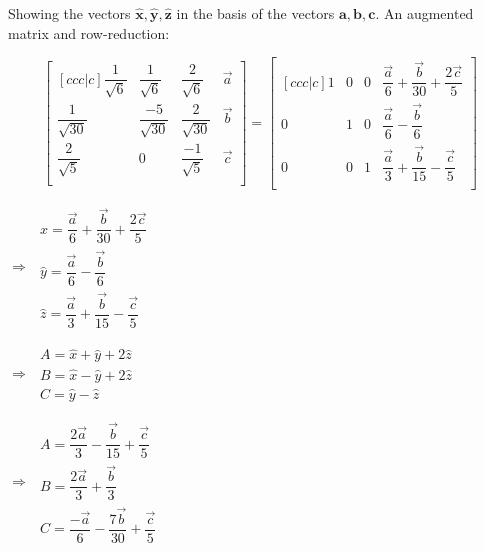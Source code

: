 \documentclass[fleqn]{article}
\begin{document}
\begin{enumerate}
Showing the vectors $\mathbf{\hat{x}}, \mathbf{\hat{y}}, \mathbf{\hat{z}}$ in the basis of the vectors $\mathbf{a}, \mathbf{b}, \mathbf{c}$. An augmented matrix and row-reduction:

\makeatletter
\renewcommand*\env@matrix[1][*\c@MaxMatrixCols c]{
  \hskip -\arraycolsep
  \let\@ifnextchar\new@ifnextchar
  \array{#1}}
\makeatother
\begin{equation}
  \begin{bmatrix}[ccc|c]
    \dfrac{1}{\sqrt{6}} & \dfrac{1}{\sqrt{6}} & \dfrac{2}{\sqrt{6}} & \overrightarrow{a} \\
    \dfrac{1}{\sqrt{30}} & \dfrac{-5}{\sqrt{30}} & \dfrac{2}{\sqrt{30}} & \overrightarrow{b} \\
    \dfrac{2}{\sqrt{5}} & 0 & \dfrac{-1}{\sqrt{5}}  & \overrightarrow{c} \\
  \end{bmatrix}
  =
  \begin{bmatrix}[ccc|c]
    1 & 0 & 0 & \dfrac{\overrightarrow{a}}{6}+\dfrac{\overrightarrow{b}}{30}+\dfrac{2\overrightarrow{c}}{5} \\
    0 & 1 & 0 & \dfrac{\overrightarrow{a}}{6}-\dfrac{\overrightarrow{b}}{6} \\
    0 & 0 & 1 & \dfrac{\overrightarrow{a}}{3}+\dfrac{\overrightarrow{b}}{15}-\dfrac{\overrightarrow{c}}{5} \\
  \end{bmatrix}
\end{equation}


$\Rightarrow$ 
$
\begin{array}{lll}
  \hat{x}= \dfrac{\overrightarrow{a}}{6}+\dfrac{\overrightarrow{b}}{30}+\dfrac{2\overrightarrow{c}}{5} \\
  \hat{y}= \dfrac{\overrightarrow{a}}{6}-\dfrac{\overrightarrow{b}}{6} \\
  \hat{z}= \dfrac{\overrightarrow{a}}{3}+\dfrac{\overrightarrow{b}}{15}-\dfrac{\overrightarrow{c}}{5}
\end{array}  
$


$\Rightarrow$ 
$
\begin{array}{lll}
  A = \hat{x}+\hat{y}+2\hat{z} \\
  B = \hat{x}-\hat{y}+2\hat{z}\\
  C = \hat{y}-\hat{z}
\end{array}  
$

\bigbreak

$\Rightarrow$ 
$
\begin{array}{lll}
  A = \dfrac{2\overrightarrow{a}}{3}-\dfrac{\overrightarrow{b}}{15}+\dfrac{\overrightarrow{c}}{5} \\
  B = \dfrac{2\overrightarrow{a}}{3}+\dfrac{\overrightarrow{b}}{3} \\
  C = \dfrac{-\overrightarrow{a}}{6}-\dfrac{7\overrightarrow{b}}{30}+\dfrac{\overrightarrow{c}}{5}
\end{array}  
$



\end{enumerate}
\end{document}
